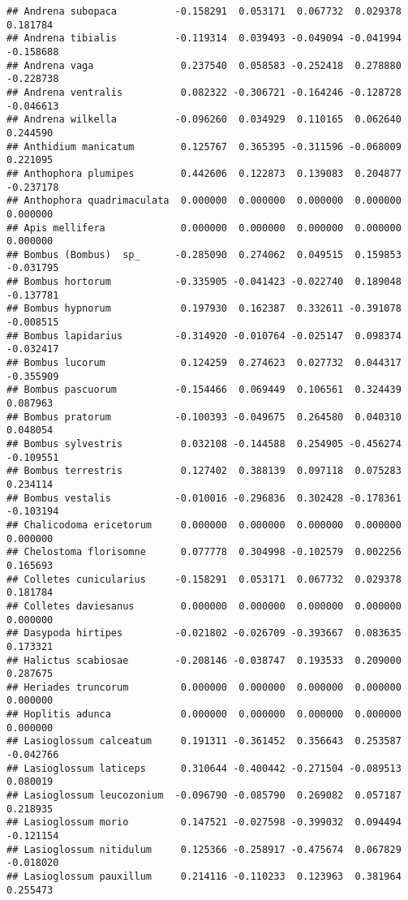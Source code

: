 \documentclass[
]{article}
\begin{document}
\begin{verbatim}
## Andrena subopaca          -0.158291  0.053171  0.067732  0.029378  0.181784
## Andrena tibialis          -0.119314  0.039493 -0.049094 -0.041994 -0.158688
## Andrena vaga               0.237540  0.058583 -0.252418  0.278880 -0.228738
## Andrena ventralis          0.082322 -0.306721 -0.164246 -0.128728 -0.046613
## Andrena wilkella          -0.096260  0.034929  0.110165  0.062640  0.244590
## Anthidium manicatum        0.125767  0.365395 -0.311596 -0.068009  0.221095
## Anthophora plumipes        0.442606  0.122873  0.139083  0.204877 -0.237178
## Anthophora quadrimaculata  0.000000  0.000000  0.000000  0.000000  0.000000
## Apis mellifera             0.000000  0.000000  0.000000  0.000000  0.000000
## Bombus (Bombus)  sp_      -0.285090  0.274062  0.049515  0.159853 -0.031795
## Bombus hortorum           -0.335905 -0.041423 -0.022740  0.189048 -0.137781
## Bombus hypnorum            0.197930  0.162387  0.332611 -0.391078 -0.008515
## Bombus lapidarius         -0.314920 -0.010764 -0.025147  0.098374 -0.032417
## Bombus lucorum             0.124259  0.274623  0.027732  0.044317 -0.355909
## Bombus pascuorum          -0.154466  0.069449  0.106561  0.324439  0.087963
## Bombus pratorum           -0.100393 -0.049675  0.264580  0.040310  0.048054
## Bombus sylvestris          0.032108 -0.144588  0.254905 -0.456274 -0.109551
## Bombus terrestris          0.127402  0.388139  0.097118  0.075283  0.234114
## Bombus vestalis           -0.010016 -0.296836  0.302428 -0.178361 -0.103194
## Chalicodoma ericetorum     0.000000  0.000000  0.000000  0.000000  0.000000
## Chelostoma florisomne      0.077778  0.304998 -0.102579  0.002256  0.165693
## Colletes cunicularius     -0.158291  0.053171  0.067732  0.029378  0.181784
## Colletes daviesanus        0.000000  0.000000  0.000000  0.000000  0.000000
## Dasypoda hirtipes         -0.021802 -0.026709 -0.393667  0.083635  0.173321
## Halictus scabiosae        -0.208146 -0.038747  0.193533  0.209000  0.287675
## Heriades truncorum         0.000000  0.000000  0.000000  0.000000  0.000000
## Hoplitis adunca            0.000000  0.000000  0.000000  0.000000  0.000000
## Lasioglossum calceatum     0.191311 -0.361452  0.356643  0.253587 -0.042766
## Lasioglossum laticeps      0.310644 -0.400442 -0.271504 -0.089513  0.080019
## Lasioglossum leucozonium  -0.096790 -0.085790  0.269082  0.057187  0.218935
## Lasioglossum morio         0.147521 -0.027598 -0.399032  0.094494 -0.121154
## Lasioglossum nitidulum     0.125366 -0.258917 -0.475674  0.067829 -0.018020
## Lasioglossum pauxillum     0.214116 -0.110233  0.123963  0.381964  0.255473

\end{verbatim}
\end{document}
